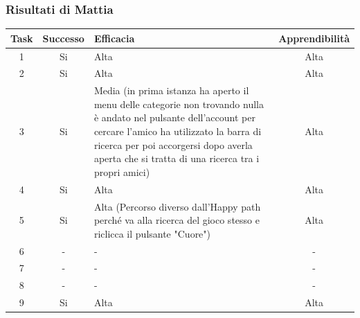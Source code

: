 \documentclass[../Report.tex]{subfiles}
\begin{document}
    \subsubsection{Risultati di Mattia}
    \begin{table}[H]
        \begin{tabular}{|c|c|p{5cm}|c|}
            \hline
            Task & Successo & Efficacia & Apprendibilità \\
            \hline
            1 & Si & Alta & Alta \\
            \hline
            2 & Si & Alta & Alta \\
            \hline
            3 & Si & Media (in prima istanza ha aperto il menu delle categorie non trovando nulla è andato nel pulsante dell'account per cercare l'amico ha utilizzato la barra di ricerca  per poi accorgersi dopo averla aperta che si tratta di una ricerca tra i propri amici) & Alta \\
            \hline
            4 & Si & Alta  & Alta \\
            \hline
            5 & Si  & Alta (Percorso diverso dall'Happy path perché va alla ricerca del gioco stesso e riclicca il pulsante "Cuore") & Alta \\
            \hline
            6 & - & -  & - \\
            \hline
            7 & - & - & - \\
            \hline
            8 & - & - & - \\
            \hline
            9 & Si & Alta & Alta \\
            \hline
        \end{tabular}

        
    \end{table}
\end{document}
